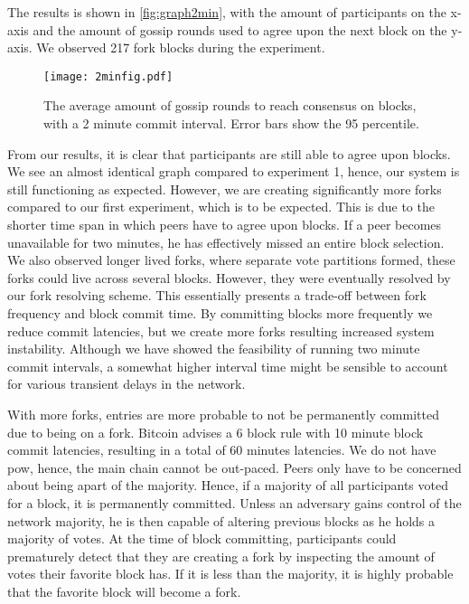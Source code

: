 \documentclass[USenglish]{uit-thesis}
\begin{document}
The results is shown in \autoref{fig:graph2min}, with the amount of participants on the x-axis and the amount of gossip rounds used to agree upon the next block on the y-axis.
We observed 217 fork blocks during the experiment.
\begin{figure}[h]
	\centering
	\texttt{[image: 2minfig.pdf]}
	\caption[Acheiving consensus with 2 minute epochs.]{The average amount of gossip rounds to reach consensus on blocks, with a 2 minute commit interval. Error bars show the 95 percentile. }
	\label{fig:graph2min}
\end{figure}

From our results, it is clear that participants are still able to agree upon blocks.
We see an almost identical graph compared to experiment 1, hence, our system is still functioning as expected.
However, we are creating significantly more forks compared to our first experiment, which is to be expected.
This is due to the shorter time span in which peers have to agree upon blocks.
If a peer becomes unavailable for two minutes, he has effectively missed an entire block selection. 
We also observed longer lived forks, where separate vote partitions formed, these forks could live across several blocks.
However, they were eventually resolved by our fork resolving scheme.
This essentially presents a trade-off between fork frequency and block commit time.
By committing blocks more frequently we reduce commit latencies, but we create more forks resulting increased system instability.
Although we have showed the feasibility of running two minute commit intervals, a somewhat higher interval time might be sensible to account for various transient delays in the network.

With more forks, entries are more probable to not be permanently committed due to being on a fork. 
Bitcoin \cite{bitcoin} advises a 6 block rule with 10 minute block commit latencies, resulting in a total of 60 minutes latencies.
We do not have \gls{pow}, hence, the main chain cannot be out-paced.
Peers only have to be concerned about being apart of the majority.
Hence, if a majority of all participants voted for a block, it is permanently committed.
Unless an adversary gains control of the network majority, he is then capable of altering previous blocks as he holds a majority of votes.
At the time of block committing, participants could prematurely detect that they are creating a fork by inspecting the amount of votes their favorite block has.
If it is less than the majority, it is highly probable that the favorite block will become a fork.
\end{document}
